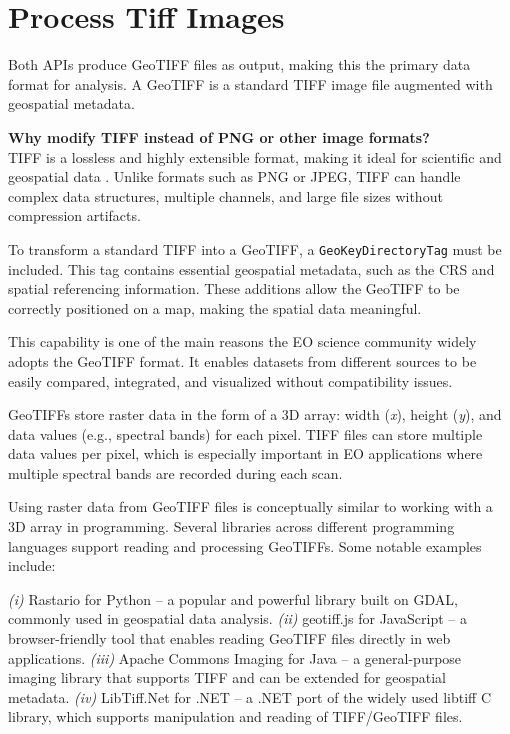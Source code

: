 \section{Process Tiff Images}
\label{Sec:ProcessTiffImages}
Both APIs produce \acrfull{GeoTIFF} files as output, making this the primary data format for analysis. A GeoTIFF is a standard TIFF image file augmented with geospatial metadata.

\textbf{Why modify TIFF instead of PNG or other image formats?} \\
TIFF is a lossless and highly extensible format, making it ideal for scientific and geospatial data \cite{ogcGeoTIFFStandard}. Unlike formats such as PNG or JPEG, TIFF can handle complex data structures, multiple channels, and large file sizes without compression artifacts.

To transform a standard TIFF into a GeoTIFF, a \texttt{GeoKeyDirectoryTag} must be included. This tag contains essential geospatial metadata, such as the CRS and spatial referencing information. These additions allow the GeoTIFF to be correctly positioned on a map, making the spatial data meaningful.

This capability is one of the main reasons the EO science community widely adopts the GeoTIFF format. It enables datasets from different sources to be easily compared, integrated, and visualized without compatibility issues.

GeoTIFFs store raster data in the form of a 3D array: width (\textit{x}), height (\textit{y}), and data values (e.g., spectral bands) for each pixel. TIFF files can store multiple data values per pixel, which is especially important in EO applications where multiple spectral bands are recorded during each scan.

Using raster data from GeoTIFF files is conceptually similar to working with a 3D array in programming. Several libraries across different programming languages support reading and processing GeoTIFFs. Some notable examples include:

\textit{(i)} Rastario for Python – a popular and powerful library built on GDAL, commonly used in geospatial data analysis.
\textit{(ii)} geotiff.js for JavaScript – a browser-friendly tool that enables reading GeoTIFF files directly in web applications.
\textit{(iii)} Apache Commons Imaging for Java – a general-purpose imaging library that supports TIFF and can be extended for geospatial metadata.
\textit{(iv)} LibTiff.Net for .NET – a .NET port of the widely used libtiff C library, which supports manipulation and reading of TIFF/GeoTIFF files.



